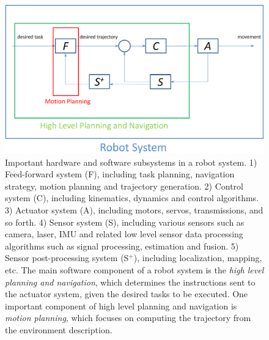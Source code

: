 \begin{figure}[htb]
  \centering
  \includegraphics[width=\linewidth]{figs/1/pipeline-crop.pdf}
  \caption[Important hardware and software subsystems in a robot system]{Important hardware and software subsystems in a robot system. 1) Feed-forward system (F), including task planning, navigation strategy, motion planning and trajectory generation. 2) Control system (C), including kinematics, dynamics and control algorithms. 3) Actuator system (A), including motors, servos, transmissions, and so forth. 4) Sensor system (S), including various sensors such as camera, laser, IMU and related low level sensor data processing algorithms such as signal processing, estimation and fusion. 5) Sensor post-processing system (S$^+$), including localization, mapping, etc. The main software component of a robot system is the \emph{high level planning and navigation}, which determines the instructions sent to the actuator system, given the desired tasks to be executed. One important component of high level planning and navigation is \emph{motion planning}, which focuses on computing the trajectory from the environment description.}
  \label{fig:1:pipeline}
\end{figure}

